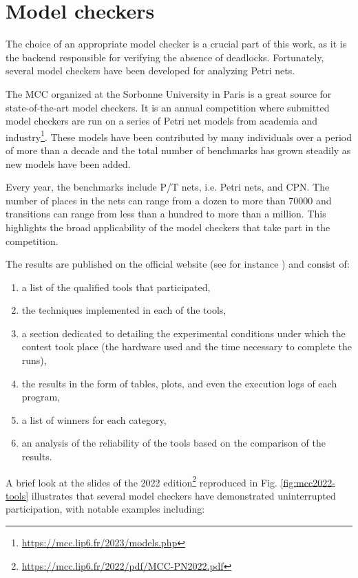 \section{Model checkers}

The choice of an appropriate model checker is a crucial part of this work,
as it is the backend responsible for verifying the absence of deadlocks.
Fortunately, several model checkers have been developed for analyzing Petri nets.

The \acrfull{MCC} \cite{khhjp2021} organized at the Sorbonne University in Paris
is a great source for state-of-the-art model checkers.
It is an annual competition where submitted model checkers are run on a series of
Petri net models from academia and industry\footnote{\url{https://mcc.lip6.fr/2023/models.php}}.
These models have been contributed by many individuals over a period of more than a decade
and the total number of benchmarks has grown steadily as new models have been added.

Every year, the benchmarks include \acrfull{P/T nets}, i.e. Petri nets, and \acrfull{CPN}.
The number of places in the nets can range from a dozen to more than 70000 and transitions
can range from less than a hundred to more than a million.
This highlights the broad applicability of the model checkers that take part in the competition.

The results are published on the official website (see for instance \cite{mcc:2022}) and consist of:

\begin{enumerate}
  \item a list of the qualified tools that participated,
  \item the techniques implemented in each of the tools,
  \item a section dedicated to detailing the experimental conditions under which the contest took place
        (the hardware used and the time necessary to complete the runs),
  \item the results in the form of tables, plots, and even the execution logs of each program,
  \item a list of winners for each category,
  \item an analysis of the reliability of the tools based on the comparison of the results.
\end{enumerate}

A brief look at the slides of the 2022 edition\footnote{\url{https://mcc.lip6.fr/2022/pdf/MCC-PN2022.pdf}}
reproduced in Fig. \ref{fig:mcc2022-tools} illustrates
that several model checkers have demonstrated uninterrupted participation,
with notable examples including:

